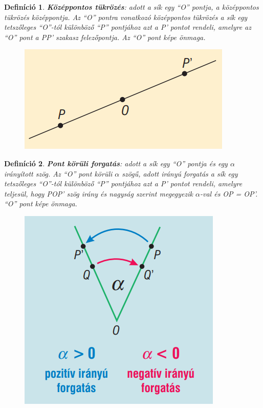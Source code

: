 \documentclass[12pt,a4paper]{article}
\newtheorem{definition}{Definíció} [section]
\begin{document}
\begin{definition}
\textbf{Középpontos tükrözés}: adott a sík egy ``O'' pontja, a középpontos tükrözés középpontja. Az ``O'' pontra vonatkozó középpontos tükrözés a sík egy tetszőleges ``O''-tól különböző ``P'' pontjához azt a P' pontot rendeli, amelyre az ``O'' pont a PP' szakasz felezőpontja. Az ``O'' pont képe önmaga.
\begin{figure}[h!]
\centering
\includegraphics[scale=0.3]{geometry/kp_tukr}
\end{figure}
\end{definition}
\newpage
\begin{definition}
\textbf{Pont körüli forgatás}: adott a sík egy ``O'' pontja és egy $\alpha$ irányított szög. Az ``O'' pont körüli $\alpha$ szögű, adott irányú forgatás a sík egy tetszőleges ``O''-tól különböző ``P'' pontjához azt a P' pontot rendeli, amelyre teljesül, hogy POP' szög irány és nagyság szerint megegyezik $\alpha$-val és OP = OP'. ``O'' pont képe önmaga.
\begin{figure}[h!]
\centering
\includegraphics[scale=0.3]{geometry/forg}
\end{figure}
\end{definition}
\end{document}
